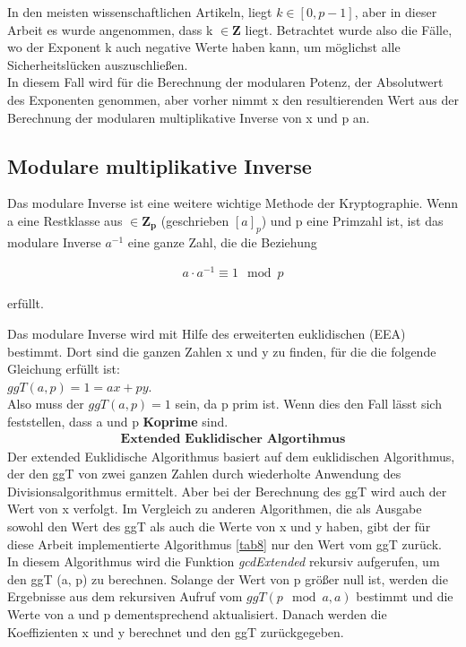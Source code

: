 In den meisten wissenschaftlichen Artikeln, liegt $ k \in [0, p-1] $, aber in dieser Arbeit es wurde angenommen, dass k $ \in \mathbf{Z}$ liegt. 
Betrachtet wurde also die Fälle, wo der Exponent k auch negative
Werte haben kann, um möglichst alle Sicherheitslücken  auszuschließen. \\

In diesem Fall wird für die Berechnung der modularen
Potenz, der Absolutwert des Exponenten genommen, aber
vorher nimmt x den
resultierenden Wert aus der Berechnung der modularen multiplikative Inverse von x und p an.


\subsection{Modulare multiplikative Inverse}

Das modulare Inverse ist eine weitere wichtige Methode der Kryptographie. Wenn a eine Restklasse aus $\in \mathbf{Z_p} $  (geschrieben $[a]_p$) und p eine Primzahl ist, ist das
modulare Inverse $ a^{-1} $ eine ganze Zahl, die die Beziehung 
\begin{ceqn}
 \begin{align*}
     a \cdot a^{-1} \equiv 1 \mod p 
 \end{align*}
\end{ceqn} erfüllt.

Das modulare Inverse wird mit Hilfe des erweiterten euklidischen (EEA) bestimmt.
Dort sind die ganzen Zahlen x und y zu finden, für die die folgende Gleichung erfüllt ist: \\
$ ggT (a, p) = 1 = ax + py $. \\
Also muss der $ ggT (a, p) = 1 $ sein, da p prim ist. Wenn dies den Fall lässt sich feststellen, dass a und p \textbf{Koprime} sind.
\begin{align*}
    \textbf{Extended Euklidischer Algortihmus}
\end{align*}
Der extended Euklidische Algorithmus basiert auf dem euklidischen Algorithmus, der den ggT von zwei ganzen Zahlen durch wiederholte Anwendung des Divisionsalgorithmus ermittelt. Aber bei der Berechnung des ggT wird auch der Wert von x verfolgt. Im Vergleich zu anderen Algorithmen, die als Ausgabe sowohl den Wert des ggT als auch die Werte von x und y haben, gibt der für diese Arbeit implementierte Algorithmus \ref{tab8} nur den Wert vom ggT zurück. \\

In diesem Algorithmus wird die Funktion \textit{gcdExtended} rekursiv aufgerufen, um den ggT (a, p) zu berechnen. Solange der Wert von p größer null ist, werden die Ergebnisse aus dem rekursiven Aufruf vom \( ggT (p \mod a, a) \) bestimmt und die Werte von a und p dementsprechend aktualisiert. Danach werden die Koeffizienten x und y berechnet und den ggT zurückgegeben.

